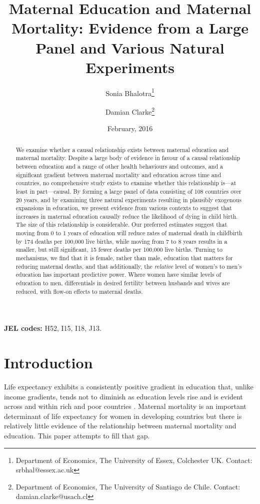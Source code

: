 \documentclass{article}[12pt,subeqn]
\title{Maternal Education and Maternal Mortality: 
Evidence from a Large Panel and Various Natural Experiments}
\author{Sonia Bhalotra\thanks{Department of Economics, The University of Essex,
    Colchester UK. Contact: srbhal@essex.ac.uk}
  \and{Damian Clarke\thanks{Department of Economics, The University of Santiago
      de Chile. Contact: damian.clarke@usach.cl}}}
\date{February, 2016}
\begin{document}
\begin{spacing}{1.4}

\maketitle

\begin{abstract}
We examine whether a causal relationship exists between maternal education and 
maternal mortality. Despite a large body of evidence in favour of a causal 
relationship between education and a range of other health behaviours and 
outcomes, and a significant gradient between maternal mortality and education 
across time and countries, no comprehensive study exists to examine whether this 
relationship is---at least in part---causal.  By forming a large panel of data 
consisting of 108 countries over 20 years, and by examining three natural 
experiments resulting in plausibly exogenous expansions in education, we present 
evidence from various contexts to suggest that increases in maternal education
causally reduce the likelihood of dying in child birth.  The size of this
relationship is considerable.  Our preferred estimates suggest that moving from 0
to 1 years of education will reduce rates of maternal death in childbirth by 174
deaths per 100,000 live births, while moving from 7 to 8 years results in a
smaller, but still significant, 15 fewer deaths per 100,000 live births.  Turning
to mechanisms, we find that it is female, rather than male, education that
matters for reducing maternal deaths, and that additionally, the \emph{relative}
level of women's to men's education has important predictive power.  Where women
have similar levels of education to men, differentials in desired fertility
between husbands and wives are reduced, with flow-on effects to maternal deaths.
\end{abstract}
\hspace{8mm} \textbf{JEL codes:} H52, I15, I18, J13.

\newpage
\section{Introduction}
Life expectancy exhibits a consistently positive gradient in education that, 
unlike income gradients, tends not to diminish as education levels rise and is 
evident across and within rich and poor countries \citep{RichardsBarry1998, 
KunstMackenbach1994, EloPreston1996, LlerasMuney2005, Mearaetal2008}. Maternal 
mortality is an important determinant of life expectancy for women in developing 
countries but there is relatively little evidence of the relationship between
maternal mortality and education. This paper attempts to fill that gap.


\end{spacing}
\end{document}
